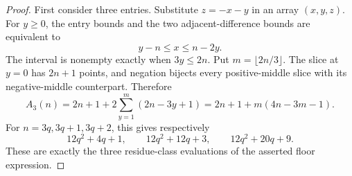 \documentclass[11pt]{article}
\begin{document}
\begin{proof}
First consider three entries. Substitute $z=-x-y$ in an array
$(x,y,z)$. For $y\ge0$, the entry bounds and the two adjacent-difference
bounds are equivalent to
\[
 y-n\le x\le n-2y.
\]
The interval is nonempty exactly when $3y\le2n$. Put
$m=\lfloor2n/3\rfloor$. The slice at $y=0$ has $2n+1$ points, and
negation bijects every positive-middle slice with its negative-middle
counterpart. Therefore
\begin{equation}\label{eq:three-slices}
 A_3(n)=2n+1+2\sum_{y=1}^{m}(2n-3y+1)
       =2n+1+m(4n-3m-1).
\end{equation}
For $n=3q,3q+1,3q+2$, this gives respectively
\[
 12q^2+4q+1,\qquad12q^2+12q+3,\qquad12q^2+20q+9.
\]
These are exactly the three residue-class evaluations of the asserted
floor expression.


\end{proof}
\end{document}
